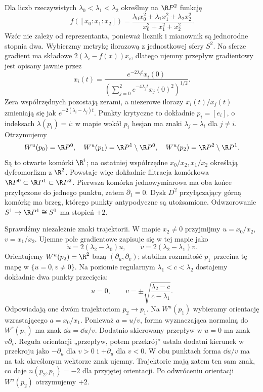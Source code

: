 \begin{przyklad}
\label{prz:morse-rp2-torsja}
Dla liczb rzeczywistych $\lambda_0<\lambda_1<\lambda_2$
określmy na $\R P^2$ funkcję
\[
 f([x_0:x_1:x_2])=
 \frac{\lambda_0x_0^2+\lambda_1x_1^2+\lambda_2x_2^2}
 {x_0^2+x_1^2+x_2^2}.
\]
Wzór nie zależy od reprezentanta, ponieważ licznik i mianownik
są jednorodne stopnia dwa. Wybierzmy metrykę ilorazową
z jednostkowej sfery $S^2$. Na sferze gradient ma składowe
$2(\lambda_i-f(x))x_i$, dlatego ujemny przepływ gradientowy
jest opisany jawnie przez
\[
 x_i(t)=\frac{e^{-2\lambda_i t}x_i(0)}
 {\left(\sum_{j=0}^2 e^{-4\lambda_jt}x_j(0)^2\right)^{1/2}}.
\]
Zera współrzędnych pozostają zerami, a niezerowe ilorazy
$x_i(t)/x_j(t)$ zmieniają się jak
$e^{-2(\lambda_i-\lambda_j)t}$.
Punkty krytyczne to dokładnie $p_i=[e_i]$, o indeksach
$\lambda(p_i)=i$: w mapie wokół $p_i$ hesjan ma znaki
$\lambda_j-\lambda_i$ dla $j\ne i$. Otrzymujemy
\[
 W^u(p_0)=\R P^0,\quad
 W^u(p_1)=\R P^1\setminus\R P^0,\quad
 W^u(p_2)=\R P^2\setminus\R P^1.
\]
Są to otwarte komórki $\R^i$; na ostatniej współrzędne
$x_0/x_2,x_1/x_2$ określają dyfeomorfizm z $\R^2$.
Powstaje więc dokładnie filtracja komórkowa
$\R P^0\subset\R P^1\subset\R P^2$.
Pierwsza komórka jednowymiarowa ma oba końce przyłączone
do jednego punktu, zatem $\partial_1=0$. Dysk
$D^2$ przyłączający górną komórkę ma brzeg, którego
punkty antypodyczne są utożsamione. Odwzorowanie
$S^1\to\R P^1\cong S^1$ ma stopień $\pm2$.

Sprawdźmy niezależnie znaki trajektorii. W mapie $x_2\ne0$
przyjmijmy $u=x_0/x_2$, $v=x_1/x_2$. Ujemne pole
gradientowe zapisuje się w tej mapie jako
\[
 \dot u=2(\lambda_2-\lambda_0)u,\qquad
 \dot v=2(\lambda_2-\lambda_1)v.
\]
Orientujemy $W^u(p_2)=\R^2$ bazą
$(\partial_u,\partial_v)$; stabilna rozmaitość $p_1$
przecina tę mapę w $\{u=0,v\ne0\}$.
Na poziomie regularnym $\lambda_1<c<\lambda_2$
dostajemy dokładnie dwa punkty przecięcia:
\[
 u=0,\qquad v=\pm\sqrt{\frac{\lambda_2-c}{c-\lambda_1}}.
\]
Odpowiadają one dwóm trajektoriom $p_2\to p_1$.
Na $W^u(p_1)$ wybieramy orientację wzrastającego
$a=x_0/x_1$. Ponieważ $a=u/v$, forma wyznaczająca
normalną do $W^s(p_1)$ ma znak $\dd a=\dd u/v$.
Dodatnio skierowany przepływ w $u=0$ ma znak
$v\partial_v$. Reguła orientacji „przepływ, potem
przekrój” ustala dodatni kierunek w przekroju
jako $-\partial_u$ dla $v>0$ i $+\partial_u$ dla $v<0$.
W obu punktach forma $\dd u/v$ ma na tak określonym
wektorze znak ujemny. Trajektorie mają zatem ten sam
znak, co daje $n(p_2,p_1)=-2$ dla przyjętej orientacji.
Po odwróceniu orientacji $W^u(p_2)$ otrzymujemy $+2$.


\end{przyklad}

